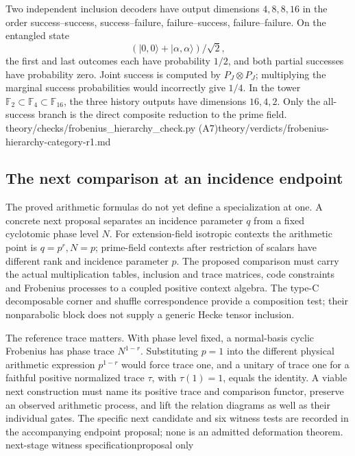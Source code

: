 Two independent inclusion decoders have output dimensions $4,8,8,16$ in
the order success--success, success--failure, failure--success,
failure--failure. On the entangled state
\[
 (|0,0\rangle+|\alpha,\alpha\rangle)/\sqrt2,
\]
the first and last outcomes
each have probability $1/2$, and both partial successes have probability
zero. Joint success is computed by $P_J\otimes P_J$; multiplying the
marginal success probabilities would incorrectly give $1/4$.
In the tower $\mathbb F_2\subset\mathbb F_4\subset\mathbb F_{16}$,
the three history outputs have dimensions $16,4,2$. Only the all-success
branch is the direct composite reduction to the prime field.
{theory/checks/frobenius\_hierarchy\_check.py (A7)}{theory/verdicts/frobenius-hierarchy-category-r1.md}

\subsection*{The next comparison at an incidence endpoint}
The proved arithmetic formulas do not yet define a specialization at one.
A concrete next proposal separates an incidence parameter $q$ from a fixed
cyclotomic phase level $N$. For extension-field isotropic contexts the
arithmetic point is $q=p^r,N=p$; prime-field contexts after restriction of
scalars have different rank and incidence parameter $p$. The proposed
comparison must carry the actual multiplication tables, inclusion and trace
matrices, code constraints and Frobenius processes to a coupled positive
context algebra. The type-C decomposable corner and shuffle correspondence
provide a composition test; their nonparabolic block does not supply a
generic Hecke tensor inclusion.

The reference trace matters. With phase level fixed, a normal-basis cyclic
Frobenius has phase trace $N^{1-r}$. Substituting $p=1$ into the different
physical arithmetic expression $p^{1-r}$ would force trace one, and a
unitary of trace one for a faithful positive normalized trace
$\tau$, with $\tau(1)=1$, equals the identity. A viable next construction must name its positive trace and
comparison functor, preserve an observed arithmetic process, and lift the
relation diagrams as well as their individual gates. The specific next
candidate and six witness tests are recorded in the accompanying endpoint
proposal; none is an admitted deformation theorem.
{next-stage witness specification}{proposal only}
